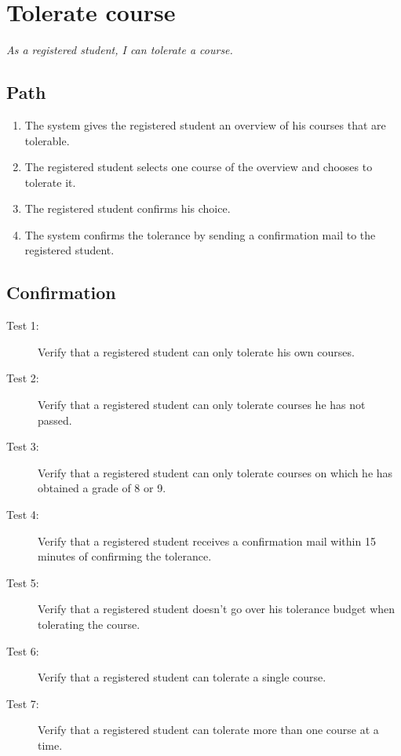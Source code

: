 \section{Tolerate course}

\par \emph{As a registered student, I can tolerate a course.}

\subsection{Path}

\begin{enumerate}
  \item The system gives the registered student an overview of his courses that
  are tolerable.
  \item The registered student selects one course of the overview and chooses to
  tolerate it.
  \item The registered student confirms his choice.
  \item The system confirms the tolerance by sending a confirmation mail to the
  registered student.
\end{enumerate}

\subsection{Confirmation}

\begin{description}
\item[Test 1:] Verify that a registered student can only tolerate his own
courses.
\item[Test 2:] Verify that a registered student can only tolerate courses he has
not passed.
\item[Test 3:] Verify that a registered student can only tolerate courses on
which he has obtained a grade of 8 or 9.
\item[Test 4:] Verify that a registered student receives a confirmation mail
within 15 minutes of confirming the tolerance.
\item[Test 5:] Verify that a registered student doesn't go over his tolerance
budget when tolerating the course.
\item[Test 6:] Verify that a registered student can tolerate a single course.
\item[Test 7:] Verify that a registered student can tolerate more than one
course at a time.
\end{description}
